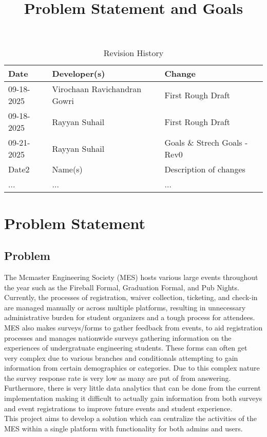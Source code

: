 \documentclass{article}
\title{Problem Statement and Goals\\\progname}
\author{\authname}
\date{}
\begin{document}
\maketitle

\begin{table}[hp]
\caption{Revision History} \label{TblRevisionHistory}
\begin{tabularx}{\textwidth}{llX}
\toprule
\textbf{Date} & \textbf{Developer(s)} & \textbf{Change}\\
\midrule
09-18-2025 & Virochaan Ravichandran Gowri & First Rough Draft\\
09-18-2025 & Rayyan Suhail & First Rough Draft\\
09-21-2025 & Rayyan Suhail & Goals \& Strech Goals - Rev0\\
Date2 & Name(s) & Description of changes\\
... & ... & ...\\
\bottomrule
\end{tabularx}
\end{table}

\section{Problem Statement}

\subsection{Problem}
The Mcmaster Engineering Society (MES) hosts various large events throughout the year such as the Fireball Formal, Graduation Formal, and Pub Nights. Currently, the processes of registration, waiver collection, ticketing, and check-in are managed manually or across multiple platforms, resulting in unnecessary administrative burden for student organizers and a tough process for attendees. MES also makes surveys/forms to gather feedback from events, to aid registration processes and manages nationwide surveys gathering information on the experiences of undergratuate engineering students. These forms can often get very complex due to various branches and conditionals attempting to gain information from certain demographics or categories. Due to this complex nature the survey response rate is very low as many are put of from answering. Furthermore, there is very little data analytics that can be done from the current implementation making it difficult to actually gain information from both surveys and event registrations to improve future events and student experience.
\\
This project aims to develop a solution which can centralize the activities of the MES within a single platform with functionality for both admins and users.
\end{document}
